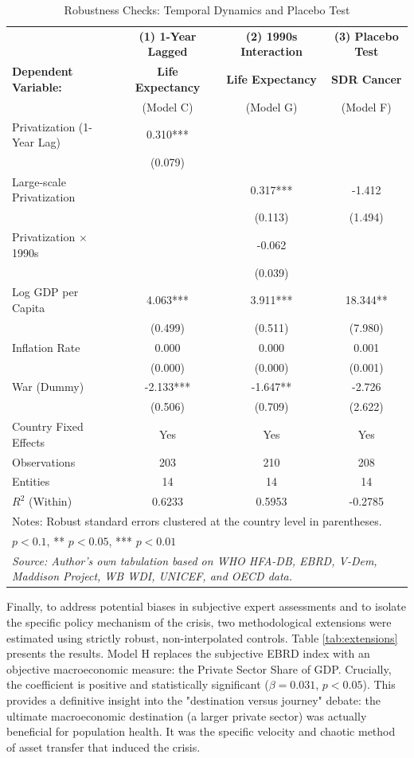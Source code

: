 \documentclass[12pt]{article}
\begin{document}
\begin{table}[H]
\centering
\caption{Robustness Checks: Temporal Dynamics and Placebo Test}
\label{tab:robustness_c}
\footnotesize
\begin{tabular}{l c c c}
\toprule
 & \textbf{(1) 1-Year Lagged} & \textbf{(2) 1990s Interaction} & \textbf{(3) Placebo Test} \\
\textbf{Dependent Variable:} & \textbf{Life Expectancy} & \textbf{Life Expectancy} & \textbf{SDR Cancer} \\
 & (Model C) & (Model G) & (Model F) \\
\midrule
Privatization (1-Year Lag) & 0.310*** & & \\
 & (0.079) & & \\
Large-scale Privatization & & 0.317*** & -1.412 \\
 & & (0.113) & (1.494) \\
Privatization $\times$ 1990s & & -0.062 & \\
 & & (0.039) & \\
Log GDP per Capita & 4.063*** & 3.911*** & 18.344** \\
 & (0.499) & (0.511) & (7.980) \\
Inflation Rate & 0.000 & 0.000 & 0.001 \\
 & (0.000) & (0.000) & (0.001) \\
War (Dummy) & -2.133*** & -1.647** & -2.726 \\
 & (0.506) & (0.709) & (2.622) \\
\midrule
Country Fixed Effects & Yes & Yes & Yes \\
Observations & 203 & 210 & 208 \\
Entities & 14 & 14 & 14 \\
$R^2$ (Within) & 0.6233 & 0.5953 & -0.2785 \\
\bottomrule
\multicolumn{4}{l}{\scriptsize Notes: Robust standard errors clustered at the country level in parentheses.} \\
\multicolumn{4}{l}{\scriptsize * $p < 0.1$, ** $p < 0.05$, *** $p < 0.01$} \\
\multicolumn{4}{l}{\scriptsize \textit{Source: Author's own tabulation based on WHO HFA-DB, EBRD, V-Dem, Maddison Project, WB WDI, UNICEF, and OECD data.}} \\
\end{tabular}
\end{table}

Finally, to address potential biases in subjective expert assessments and to isolate the specific policy mechanism of the crisis, two methodological extensions were estimated using strictly 
robust, non-interpolated controls. Table \ref{tab:extensions} presents the results. Model H replaces the subjective EBRD index with an objective macroeconomic measure: the Private Sector 
Share of GDP. Crucially, the coefficient is positive and statistically significant ($\beta = 0.031$, $p < 0.05$). This provides a definitive insight into the "destination versus journey" 
debate: the ultimate macroeconomic destination (a larger private sector) was actually beneficial for population health. It was the specific velocity and chaotic method of asset transfer that 
induced the crisis. 
\end{document}
